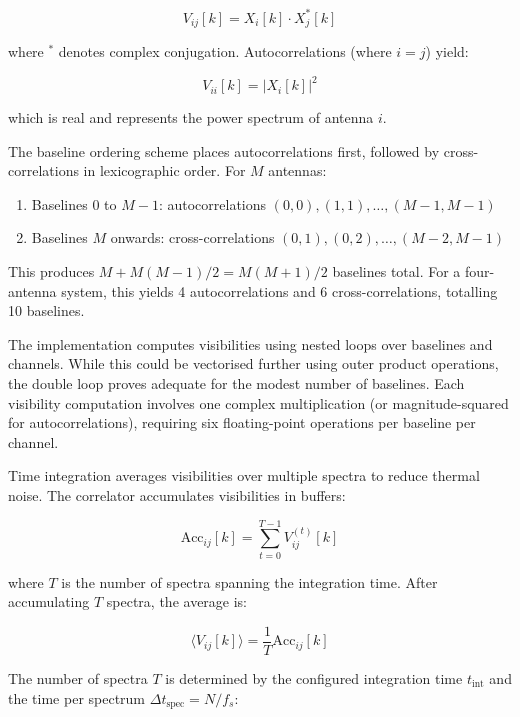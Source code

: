 \begin{equation}
    V_{ij}[k] = X_i[k] \cdot X_j^*[k]
\end{equation}

where $^*$ denotes complex conjugation. Autocorrelations (where $i=j$) yield:

\begin{equation}
    V_{ii}[k] = |X_i[k]|^2
\end{equation}

which is real and represents the power spectrum of antenna $i$.

The baseline ordering scheme places autocorrelations first, followed by cross-correlations in lexicographic order. For $M$ antennas:

\begin{enumerate}
    \item Baselines 0 to $M-1$: autocorrelations $(0,0), (1,1), \ldots, (M-1,M-1)$
    \item Baselines $M$ onwards: cross-correlations $(0,1), (0,2), \ldots, (M-2,M-1)$
\end{enumerate}

This produces $M + M(M-1)/2 = M(M+1)/2$ baselines total. For a four-antenna system, this yields 4 autocorrelations and 6 cross-correlations, totalling 10 baselines.

The implementation computes visibilities using nested loops over baselines and channels. While this could be vectorised further using outer product operations, the double loop proves adequate for the modest number of baselines. Each visibility computation involves one complex multiplication (or magnitude-squared for autocorrelations), requiring six floating-point operations per baseline per channel.

Time integration averages visibilities over multiple spectra to reduce thermal noise. The correlator accumulates visibilities in buffers:

\begin{equation}
    \text{Acc}_{ij}[k] = \sum_{t=0}^{T-1} V_{ij}^{(t)}[k]
\end{equation}

where $T$ is the number of spectra spanning the integration time. After accumulating $T$ spectra, the average is:

\begin{equation}
    \langle V_{ij}[k] \rangle = \frac{1}{T} \text{Acc}_{ij}[k]
\end{equation}

The number of spectra $T$ is determined by the configured integration time $t_{\text{int}}$ and the time per spectrum $\Delta t_{\text{spec}} = N / f_s$:

